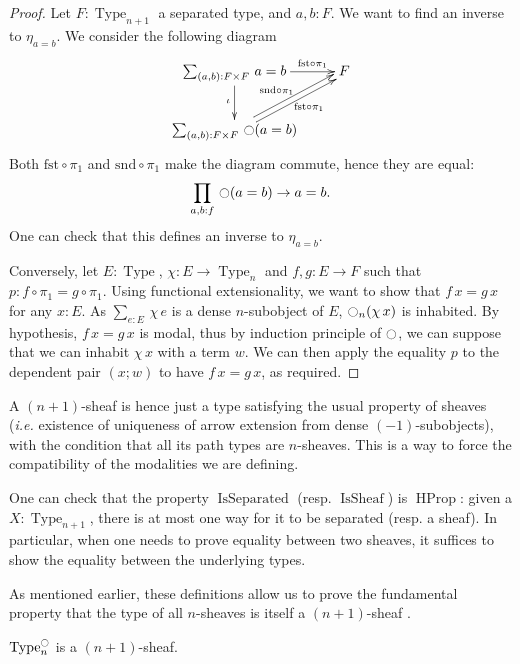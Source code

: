 \documentclass[notfinal]{jfrarticle}
\makeatletter
\def\dar[#1]#2{\ar@<-#2>[#1]\ar@<#2>[#1]} %
\DeclareMathOperator{\Type}{Type}
\DeclareMathOperator{\HProp}{HProp}
\newcommand{\modal}{\ensuremath{\ocircle}}
\newcommand{\sumD}[3]{\sum_{#1:#2}\, #3}
\newcommand{\prodD}[3]{\prod_{#1:#2}\, #3}
\newcommand{\code}[1]{\texttt{#1}}
\DeclareMathOperator{\issep}{IsSeparated}
\DeclareMathOperator{\issheaf}{IsSheaf}
\newcommand{\ie}{\emph{i.e.}}
\makeatother
\begin{document}
\begin{proof}
  Let $F:\Type_{n+1}$ a separated type, and $a,b:F$. We want to find
  an inverse to $\eta_{a=b}$. We consider the following diagram 
   \[ \xymatrix{
    \sumD {(a,b)} {F\times F} {a=b} \ar[r]^-{\text{fst} \circ \pi_1} \ar[d]_{\iota} & F \\
    \sumD {(a,b)} {F\times F} {\modal(a=b)}
    \dar[ru]{2pt}_{\quad\text{fst}\circ \pi_1} ^{\text{snd} \circ \pi_1} &
  }\]
  Both $\text{fst} \circ \pi_1$ and $\text{snd}\circ\pi_1$ make the
  diagram commute, hence they are equal:
  \[\prodD {a,b} f {\modal (a=b) \to a = b}.\]
  One can check that this defines an inverse to $\eta_{a=b}$.


  Conversely, let $E:\Type$, $\chi: E \to\Type_n$ and $f,g: E\to
  F$ such that $p:f\circ\pi_1 = g\circ \pi_1$.
  Using functional extensionality, we want to show that $f\, x=g\,x $
  for any $x:E$. As $\sumD e E {\chi\, e}$ is a dense $n$-subobject of $E$,
  $\modal_n (\chi\, x)$ is inhabited. By hypothesis, $f\, x = g\, x$
  is modal, thus by induction principle of $\modal$, we can suppose
  that we can inhabit $\chi\, x$ with a term $w$. We can then apply
  the equality $p$ to the dependent pair $(x;w)$ to have $f\, x =
  g\, x$, as required. 
\end{proof}

A $(n+1)$-sheaf is hence just a type satisfying the usual property of sheaves
(\ie{} existence of uniqueness of arrow extension from dense
$(-1)$-subobjects), with the condition that all its path types are
$n$-sheaves. This is a way to force the compatibility of the modalities we
are defining.

One can check that the property $\issep$ (resp. $\issheaf$) is $\HProp$:
given a $X:\Type_{n+1}$, there is at most one way for it to be separated
(resp. a sheaf). In particular, when one needs to prove equality between
two sheaves, it suffices to show the equality between the underlying
types.

As mentioned earlier, these definitions allow us to prove the fundamental
property that the type of all $n$-sheaves is itself a $(n+1)$-sheaf
.

\begin{prop}[\thethm\ (\code{nType\_j\_Type\_is\_SnType\_j\_Type})]
\label{prop:sheaf-is-sheaf}
  $\Type_n^\modal$ is a $(n+1)$-sheaf.
\end{prop}
\end{document}

